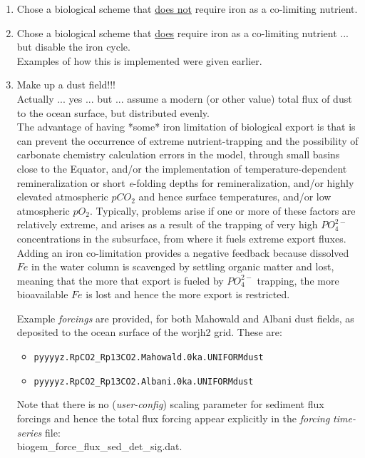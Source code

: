 \documentclass[11pt,fleqn]{book} %
\begin{document}
\begin{enumerate}[noitemsep]
\vspace{1mm}
\item Chose a biological scheme that \uline{does not} require iron as a co-limiting nutrient.
\vspace{1mm}
\item Chose a biological scheme that \uline{does} require iron as a co-limiting nutrient ... but disable the iron cycle. 
\\Examples of how this is implemented were given earlier.
\item Make up a dust field!!!
\\Actually ... yes ... but ... assume a modern (or other value) total flux of dust to the ocean surface, but distributed evenly.
\\The advantage of having *some* iron limitation of biological export is that is can prevent the occurrence of extreme nutrient-trapping and the possibility of carbonate chemistry calculation errors in the model, through small basins close to the Equator, and/or the implementation of temperature-dependent remineralization or short \textit{e}-folding depths for  remineralization, and/or highly elevated atmospheric \(pCO_{2}\) and hence surface temperatures, and/or low atmospheric \(pO_{2}\). Typically, problems arise if one or more of these factors are relatively extreme, and arises as a result of the trapping of very high \(PO^{2-}_{4}\) concentrations in the subsurface, from where it fuels extreme export fluxes. Adding an iron co-limitation provides a negative feedback because dissolved \(Fe\) in the water column is scavenged by settling organic matter and lost, meaning that the more that export is fueled by \(PO^{2-}_{4}\) trapping, the more bioavailable \(Fe\) is lost and hence the more export is restricted.

\vspace{1mm}
Example \textit{forcings} are provided, for both Mahowald and Albani dust fields, as deposited to the  ocean surface of the \textsf{\footnotesize worjh2} grid. These are:
\vspace{1mm}
\begin{itemize}[noitemsep]
\item \texttt{\small pyyyyz.RpCO2\_Rp13CO2.Mahowald.0ka.UNIFORMdust}
\item \texttt{\small pyyyyz.RpCO2\_Rp13CO2.Albani.0ka.UNIFORMdust}
\end{itemize}
\vspace{1mm}
Note that there is no (\textit{user-config}) scaling parameter for sediment flux forcings and hence the total flux forcing appear explicitly in the \textit{forcing} \textit{time-series} file: 
\\\textsf{\footnotesize biogem\_force\_flux\_sed\_det\_sig.dat}.


\end{enumerate}
\end{document}
